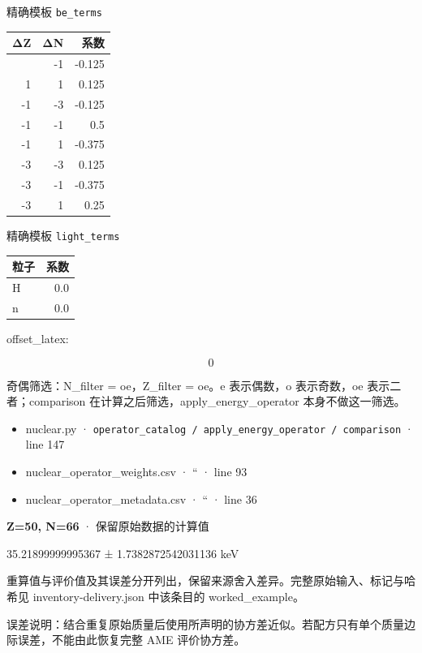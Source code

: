 \documentclass[
  11pt,
  letterpaper,
]{article}
\providecommand{\tightlist}{%
  \setlength{\itemsep}{0pt}\setlength{\parskip}{0pt}}
\begin{document}
精确模板 \texttt{be\_terms}

\begin{longtable}[]{@{}rrr@{}}
\toprule\noalign{}
ΔZ & ΔN & 系数 \\
\midrule\noalign{}
\endhead
\bottomrule\noalign{}
\endlastfoot
1 & -1 & -0.125 \\
1 & 1 & 0.125 \\
-1 & -3 & -0.125 \\
-1 & -1 & 0.5 \\
-1 & 1 & -0.375 \\
-3 & -3 & 0.125 \\
-3 & -1 & -0.375 \\
-3 & 1 & 0.25 \\
\end{longtable}

精确模板 \texttt{light\_terms}

\begin{longtable}[]{@{}lr@{}}
\toprule\noalign{}
粒子 & 系数 \\
\midrule\noalign{}
\endhead
\bottomrule\noalign{}
\endlastfoot
H & 0.0 \\
n & 0.0 \\
\end{longtable}

offset\_latex:

\[
0
\]

奇偶筛选：N\_filter = oe，Z\_filter = oe。e 表示偶数，o 表示奇数，oe
表示二者；comparison 在计算之后筛选，apply\_energy\_operator
本身不做这一筛选。

\begin{itemize}
\tightlist
\item
  nuclear.py ·
  \texttt{operator\_catalog\ /\ apply\_energy\_operator\ /\ comparison}
  · line 147
\item
  nuclear\_operator\_weights.csv · `` · line 93
\item
  nuclear\_operator\_metadata.csv · `` · line 36
\end{itemize}

\textbf{Z=50, N=66} · 保留原始数据的计算值

35.21899999995367 ± 1.7382872542031136 keV

重算值与评价值及其误差分开列出，保留来源舍入差异。完整原始输入、标记与哈希见
inventory-delivery.json 中该条目的 worked\_example。

误差说明：结合重复原始质量后使用所声明的协方差近似。若配方只有单个质量边际误差，不能由此恢复完整
AME 评价协方差。
\end{document}
